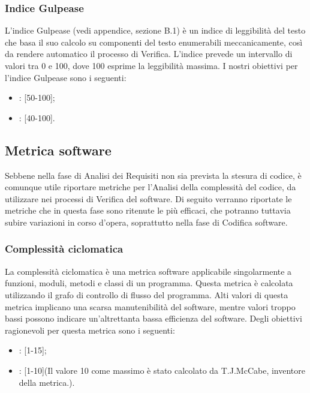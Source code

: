 \subsubsection{Indice Gulpease}
\label{4.1.1}
L'indice Gulpease (vedi appendice, sezione B.1) è un indice di leggibilità del testo che basa il suo calcolo su componenti del testo enumerabili meccanicamente, così da rendere automatico il processo di Verifica.
L'indice prevede un intervallo di valori tra 0 e 100, dove 100 esprime la leggibilità massima.
I nostri obiettivi per l'indice Gulpease sono i seguenti:
\begin{itemize}
\item {}: [50-100];
\item {}: [40-100].
\end{itemize}

\subsection{Metrica software}
\label{4.2}
Sebbene nella fase di Analisi dei Requisiti non sia prevista la stesura di codice, è comunque utile riportare metriche per l'Analisi della complessità del codice, da utilizzare nei processi di Verifica del software. Di seguito verranno riportate le metriche che in questa fase sono ritenute le più efficaci, che potranno tuttavia subire variazioni in corso d'opera, soprattutto nella fase di Codifica software.

\subsubsection{Complessità ciclomatica}
\label{4.2.1}
La complessità ciclomatica è una metrica software applicabile singolarmente a funzioni, moduli, metodi e classi di un programma.
Questa metrica è calcolata utilizzando il grafo di controllo di flusso del programma.
Alti valori di questa metrica implicano una scarsa manutenibilità del software, mentre valori troppo bassi possono indicare un'altrettanta bassa efficienza del software.
Degli obiettivi ragionevoli per questa metrica sono i seguenti:
\begin{itemize}
\item {}: [1-15];
\item {}: [1-10](Il valore 10 come massimo è stato calcolato da T.J.McCabe, inventore della metrica.).
\end{itemize}


